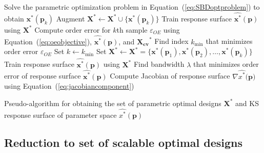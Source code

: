 \begin{algorithm}
	\DontPrintSemicolon %
	 {
		Solve the parametric optimization problem in Equation~(\ref{eq:SBDoptproblem}) to obtain $\mathbf{x}^*(\mathbf{p}_k)$\;
		Augment $\mathbf{X}^* \gets \mathbf{X}^* \cup \{ \mathbf{x}^*(\mathbf{p}_k) \} $\;
		Train response surface $\hat{\mathbf{x}^*}(\mathbf{p})$ using $\mathbf{X}^*$\;
		Compute order error for $k$th sample $\varepsilon_{OE}$ using Equation~(\ref{eq:oeobjective}), $\hat{\mathbf{x}^*}(\mathbf{p})$, and $\mathbf{X_{cv}}^*$\;
	}
	Find index $k_{\textrm{min}}$ that minimizes order error $\varepsilon_{OE}$\;
	Set $k \gets k_{\textrm{min}} $ \;
	Set $\mathbf{X}^* \gets \mathbf{X}^*= \{ \mathbf{x}^*(\mathbf{p}_1),\mathbf{x}^*(\mathbf{p}_2),\ldots,\mathbf{x}^*(\mathbf{p}_k) \} $ \;
	Train response surface $\hat{\mathbf{x}^*}(\mathbf{p})$ using $\mathbf{X}^*$ \;
	Find bandwidth $\lambda$ that minimizes order error of response surface $\hat{\mathbf{x}^*}(\mathbf{p})$\;
	Compute Jacobian of response surface $\nabla\hat{{x}^*}(\mathbf{p)}$ using Equation~(\ref{eq:jacobiancomponent})\;
	\caption{Pseudo-algorithm for obtaining the set of parametric optimal designs $\mathbf{X}^*$ and \ac{KS} response surface of parameter space $\hat{{x}^*}(\mathbf{p})$}
	\label{algo:PODalgo}
\end{algorithm}

\subsection{Reduction to set of scalable optimal designs} \label{subsec:SBDfAM}

